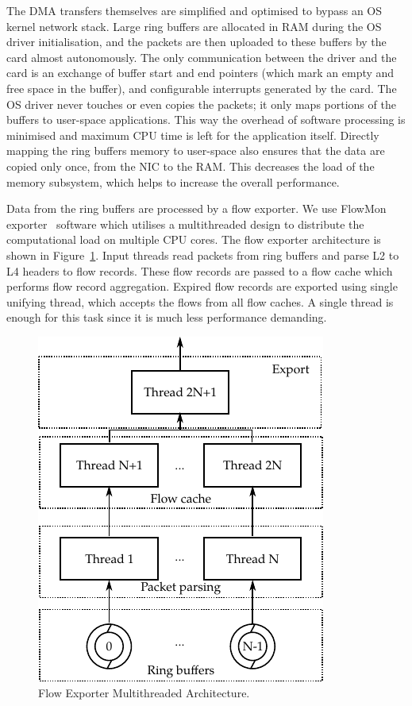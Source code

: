The DMA transfers themselves are simplified and optimised to bypass an OS kernel network stack. Large ring buffers are allocated in RAM during the OS driver initialisation, and the packets are then uploaded to these buffers by the card almost autonomously. The only communication between the driver and the card is an exchange of buffer start and end pointers (which mark an empty and free space in the buffer), and configurable interrupts generated by the card. The OS driver never touches or even copies the packets; it only maps portions of the buffers to user-space applications. This way the overhead of software processing is minimised and maximum CPU time is left for the application itself. Directly mapping the ring buffers memory to user-space also ensures that the data are copied only once, from the NIC to the RAM. This decreases the load of the memory subsystem, which helps to increase the overall performance.

Data from the ring buffers are processed by a flow exporter. We use FlowMon exporter~\cite{FlowmonNetworks--Flowmon} software which utilises a multithreaded design to distribute the computational load on multiple CPU cores. The flow exporter architecture is shown in Figure~\ref{fig:exporter}. Input threads read packets from ring buffers and parse L2 to L4 headers to flow records. These flow records are passed to a flow cache which performs flow record aggregation. Expired flow records are exported using single unifying thread, which accepts the flows from all flow caches. A single thread is enough for this task since it is much less performance demanding.

\begin{figure}[t]
    \centering 
    \includegraphics{figures/paper-highdensity/fig/exporter}
    \caption{Flow Exporter Multithreaded Architecture.}
    \label{fig:exporter}
\end{figure}

